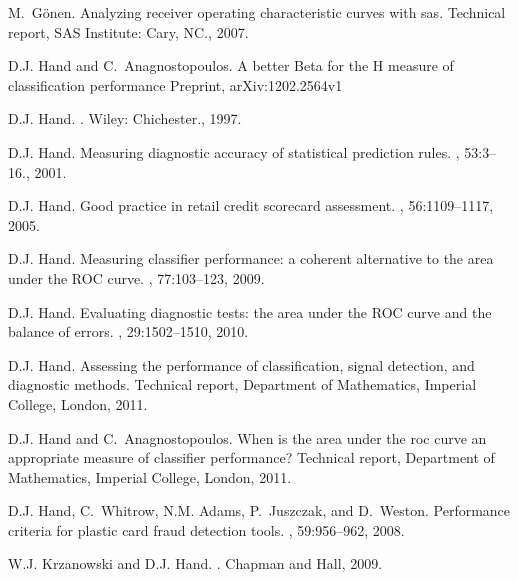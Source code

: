 \documentclass{article}
\begin{document}



\begin{thebibliography}{10}

M.~G\"{o}nen.
\newblock Analyzing receiver operating characteristic curves with sas.
\newblock Technical report, SAS Institute: Cary, NC., 2007.

D.J. Hand and C.~Anagnostopoulos.
\newblock A better Beta for the H measure of classification performance
\newblock Preprint, arXiv:1202.2564v1


D.J. Hand.
.
\newblock Wiley: Chichester., 1997.

D.J. Hand.
\newblock Measuring diagnostic accuracy of statistical prediction rules.
, 53:3--16., 2001.

D.J. Hand.
\newblock Good practice in retail credit scorecard assessment.
, 56:1109--1117,
  2005.

D.J. Hand.
\newblock Measuring classifier performance: a coherent alternative to the area
  under the {ROC} curve.
, 77:103--123, 2009.

D.J. Hand.
\newblock Evaluating diagnostic tests: the area under the {ROC} curve and the
  balance of errors.
, 29:1502--1510, 2010.

D.J. Hand.
\newblock Assessing the performance of classification, signal detection, and
  diagnostic methods.
\newblock Technical report, Department of Mathematics, Imperial College,
  London, 2011.

D.J. Hand and C.~Anagnostopoulos.
\newblock When is the area under the roc curve an appropriate measure of
  classifier performance?
\newblock Technical report, Department of Mathematics, Imperial College,
  London, 2011.

D.J. Hand, C.~Whitrow, N.M. Adams, P.~Juszczak, and D.~Weston.
\newblock Performance criteria for plastic card fraud detection tools.
, 59:956--962, 2008.

W.J. Krzanowski and D.J. Hand.
.
\newblock Chapman and Hall, 2009.


\end{thebibliography}
\end{document}
